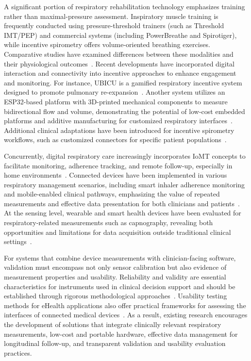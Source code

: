 \documentclass{ieeeaccess}
\begin{document}
A significant portion of respiratory rehabilitation technology emphasizes training rather than maximal-pressure assessment. Inspiratory muscle training is frequently conducted using pressure-threshold trainers (such as Threshold IMT/PEP) and commercial systems (including PowerBreathe and Spirotiger), while incentive spirometry offers volume-oriented breathing exercises. Comparative studies have examined differences between these modalities and their physiological outcomes~\cite{Gohl2016,paivaInspiratoryMuscleTraining2015,fernandez-lazaroInspiratoryMuscleTraining2021}. Recent developments have incorporated digital interaction and connectivity into incentive approaches to enhance engagement and monitoring. For instance, UBICU is a gamified respiratory incentive system designed to promote pulmonary re-expansion~\cite{aguilarZambranoUbicu2025}. Another system utilizes an ESP32-based platform with 3D-printed mechanical components to measure bidirectional flow and volume, demonstrating the potential of low-cost embedded platforms and additive manufacturing for customized respiratory interfaces~\cite{polancoBiomedicalEquipmentUbicu2024}. Additional clinical adaptations have been introduced for incentive spirometry workflows, such as customized connectors for specific patient populations~\cite{sankarGaneshIncentiveSpirometry2024}.

Concurrently, digital respiratory care increasingly incorporates IoMT concepts to facilitate monitoring, adherence tracking, and remote follow-up, especially in home environments~\cite{ndiayeIoTWakeCOVID192020,bosnic-anticevichAdvancingDigitalSolutions2023,pinnockImplementationDigitalHome2023}. Connected devices have been implemented in various respiratory management scenarios, including smart inhaler adherence monitoring and mobile-enabled clinical pathways, emphasizing the value of repeated measurements and effective data presentation for both clinicians and patients~\cite{dhruveAssessingAdherenceInhaled2022,kimApplicationInternetMedical2022}. At the sensing level, wearable and smart health devices have been evaluated for respiratory-related measurements such as capnography, revealing both opportunities and limitations for data acquisition outside traditional clinical settings~\cite{moraisIoTBasedWearableSmart2023}.

For systems that combine device measurements with clinician-facing software, validation must encompass not only sensor calibration but also evidence of measurement properties and usability. Reliability and validity are essential characteristics for instruments used in clinical decision support and should be established through rigorous methodological approaches~\cite{Souza2017,Polit2006}. Usability testing methods for eHealth applications also offer practical frameworks for assessing the interfaces of connected medical devices~\cite{Maramba2019}. As a result, existing research encourages the development of solutions that integrate clinically relevant respiratory measurements, low-cost and portable hardware, effective data management for longitudinal follow-up, and transparent validation and usability evaluation practices.
\end{document}
